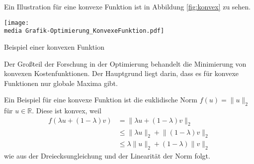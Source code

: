 Ein Illustration f\"ur eine konvexe Funktion ist in Abbildung \ref{fig:konvex} zu sehen. 
 \begin{dsafigure}
 \begin{center}
 \texttt{[image: \\media Grafik-Optimierung\_KonvexeFunktion.pdf]}
 \caption{Beispiel einer konvexen Funktion}
 \label{fig:konvex}
 \end{center}
\end{dsafigure}
Der Gro\ss teil der Forschung in der Optimierung behandelt die Minimierung von konvexen Kostenfunktionen. Der Hauptgrund liegt darin, dass es f\"ur konvexe Funktionen nur globale Maxima gibt. 


\begin{Bsp}
Ein Beispiel für eine konvexe Funktion ist die euklidische Norm $f(u) = \lVert u\rVert_2$ für $u\in\mathbb{R}$. Diese ist konvex, weil
\begin{align*}
f(\lambda u+(1-\lambda)v) &=\lVert\lambda u+(1-\lambda)v\rVert_2\\
&\leq\lVert\lambda u\rVert_2+\lVert(1-\lambda)v\rVert_2\\
&\leq\lambda\lVert u\rVert_2+(1-\lambda)\lVert v\rVert_2
\end{align*}
wie aus der Dreiecksungleichung und der Linearität der Norm folgt.
\end{Bsp}
